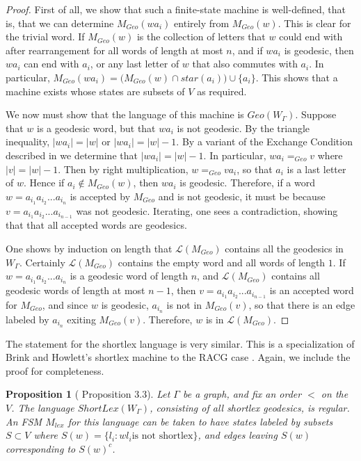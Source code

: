 \documentclass{amsart}
\newtheorem{proposition}[theorem]{Proposition}
\theoremstyle{definition}
\theoremstyle{remark}
\begin{document}
	\begin{proof}
		
		First of all, we show that such a finite-state machine is well-defined, that is, that we can determine $M_{Geo}(wa_i)$ entirely from $M_{Geo}(w)$. This is clear for the trivial word. If $M_{Geo}(w)$ is the collection of letters that $w$ could end with after rearrangement for all words of length at most $n$, and if $wa_i$ is geodesic, then $wa_i$ can end with $a_i$, or any last letter of $w$ that also commutes with $a_i$. In particular, $M_{Geo}(wa_i)=\bigl(M_{Geo}(w)\cap star(a_i)\bigr)\cup\{a_i\}$. This shows that a machine exists whose states are subsets of $V$ as required.
		
		We now must show that the language of this machine is $Geo(W_\Gamma)$. Suppose that $w$ is a geodesic word, but that $wa_i$ is not geodesic. By the triangle inequality, $|wa_i|=|w|$ or $|wa_i|=|w|-1$. By a variant of the Exchange Condition described in \cite{Davis} we determine that $|wa_i|=|w|-1$. In particular, $wa_i=_{Geo}v$ where $|v|=|w|-1$. Then by right multiplication, $w=_{Geo}va_i$, so that $a_i$ is a last letter of $w$. Hence if $a_i\not\in M_{Geo}(w)$, then $wa_i$ is geodesic. Therefore, if a word $w=a_{i_1}a_{i_2}...a_{i_n}$ is accepted by $M_{Geo}$ and is not geodesic, it must be because $v=a_{i_1}a_{i_2}...a_{i_{n-1}}$ was not geodesic. Iterating, one sees a contradiction, showing that that all accepted words are geodesics. 
		
		One shows by induction on length that  $\mathscr{L}(M_{Geo})$ contains all the geodesics in $W_\Gamma$. Certainly $\mathscr{L}(M_{Geo})$ contains the empty word and all words of length $1$. If $w=a_{i_1}a_{i_2}...a_{i_n}$ is a geodesic word of length $n$, and $\mathscr{L}(M_{Geo})$ contains all geodesic words of length at most $n-1$, then $v=a_{i_1}a_{i_2}...a_{i_{n-1}}$ is an accepted word for $M_{Geo}$, and since $w$ is geodesic, $a_{i_n}$ is not in $M_{Geo}(v)$, so that there is an edge labeled by $a_{i_n}$ exiting $M_{Geo}(v)$. Therefore, $w$ is in $\mathscr{L}(M_{Geo})$. 
	 \end{proof}
	
	The statement for the shortlex language is very similar. This is a specialization of Brink and Howlett's shortlex machine to the RACG case \cite{BrinkHowlett}. Again, we include the proof for completeness.
	
	\begin{proposition} [\cite{BrinkHowlett} Proposition 3.3]
		
		Let $\Gamma$ be a graph, and fix an order $<$ on the $V$. The language $ShortLex(W_\Gamma)$, consisting of all shortlex geodesics, is regular. An FSM $M_{lex}$ for this language can be taken to have states labeled by subsets $S\subset V$ where $S(w)=\{l_i: wl_i \text{is not shortlex}\}$, and edges leaving $S(w)$ corresponding to $S(w)^c$.
		
	\end{proposition}
	
\end{document}
